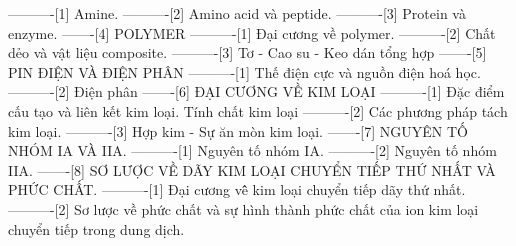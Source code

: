 ----------[1] Amine.
----------[2] Amino acid và peptide.
----------[3] Protein và enzyme.
-------[4] POLYMER
----------[1] Đại cương về polymer.
----------[2] Chất dẻo và vật liệu composite.
----------[3] Tơ - Cao su - Keo dán tổng hợp
-------[5] PIN ĐIỆN VÀ ĐIỆN PHÂN
----------[1] Thế điện cực và nguồn điện hoá học. 
----------[2] Điện phân
-------[6] ĐẠI CƯƠNG VỀ KIM LOẠI
----------[1] Đặc điểm cấu tạo và liên kết kim loại. Tính chất kim loại
----------[2] Các phương pháp tách kim loại.
----------[3] Hợp kim - Sự ăn mòn kim loại.
-------[7] NGUYÊN TỐ NHÓM IA VÀ IIA.
----------[1] Nguyên tố nhóm IA.
----------[2] Nguyên tố nhóm IIA.
-------[8] SƠ LƯỢC VỀ DÃY KIM LOẠI CHUYỂN TIẾP THỨ NHẤT VÀ PHỨC CHẤT.
----------[1] Đại cương vê̂ kim loại chuyển tiếp dãy thứ nhất. 
----------[2] Sơ lược về phức chất và sự hình thành phức chất của ion kim loại chuyển tiếp trong dung dịch.
